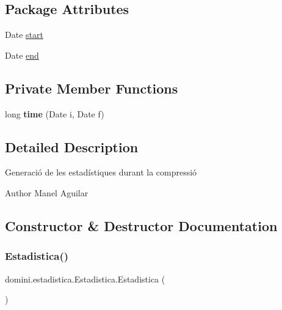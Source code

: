 \subsection*{Package Attributes}
\begin{DoxyCompactItemize}
\item 
Date \hyperlink{classdomini_1_1estadistica_1_1Estadistica_aee0ae604272563ceab4e61392cbd343e}{start}
\item 
Date \hyperlink{classdomini_1_1estadistica_1_1Estadistica_ae99e664f0569e308009ec7ca32864006}{end}
\end{DoxyCompactItemize}
\subsection*{Private Member Functions}
\begin{DoxyCompactItemize}
\item 
\mbox{\label{classdomini_1_1estadistica_1_1Estadistica_a7587e21e3f7f177afe0dd36483c8fe5d}} 
long {\bfseries time} (Date i, Date f)
\end{DoxyCompactItemize}


\subsection{Detailed Description}
Generació de les estadístiques durant la compressió 

\begin{DoxyAuthor}{Author}
Manel Aguilar 
\end{DoxyAuthor}


\subsection{Constructor \& Destructor Documentation}
\mbox{\label{classdomini_1_1estadistica_1_1Estadistica_a16c37d85709413fd65f8dee111faed49}} 
\subsubsection{\texorpdfstring{Estadistica()}{Estadistica()}}
{\footnotesize\ttfamily domini.\+estadistica.\+Estadistica.\+Estadistica (\begin{DoxyParamCaption}{ }\end{DoxyParamCaption})\hspace{0.3cm}{\ttfamily [inline]}}



